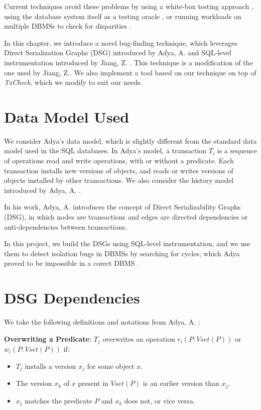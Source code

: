 Current techniques avoid these problems by using a white-box testing approach \cite{clark2024validating}, using the database system itself as a testing oracle \cite{jiang2023detecting}, or running workloads on multiple DBMSs to check for disparities \cite{cui2022differentially_ASE2022}.

In this chapter, we introduce a novel bug-finding technique, which leverages Direct Serialization Graphs (DSG) introduced by Adya, A. \cite{adya1999weak} and SQL-level instrumentation introduced by Jiang, Z. \cite{jiang2023detecting}. This technique is a modification of the one used by Jiang, Z.. We also implement a tool based on our technique on top of \textit{TxCheck}, which we modify to suit our needs.


\section{Data Model Used}

We consider Adya's data model, which is slightly different from the standard data model used in the SQL databases. In Adya's model, a transaction $T_i$ is a sequence of operations read and write operations, with or without a predicate. Each transaction installs new versions of objects, and reads or writes versions of objects installed by other transactions. We also consider the history model introduced by Adya, A. \cite{adya1999weak}.

In his work, Adya, A. \cite{adya1999weak} introduces the concept of Direct Serializability Graphs (DSG), in which nodes are transactions and edges are directed dependencies or anti-dependencies between transactions.

In this project, we build the DSGs using SQL-level instrumentation, and we use them to detect isolation bugs in DBMSs by searching for cycles, which Adya proved to be impossible in a corect DBMS \cite{adya1999weak}.

\section{DSG Dependencies}

We take the following definitions and notations from Adya, A. \cite{adya1999weak}:


\begin{definition}
    \textbf{Overwriting a Predicate}: $T_j$ overwrites an operation $r_i(P: Vset(P))$ or $w_i(P: Vset(P))$ if:
    \begin{itemize}
        \item $T_j$ installs a version $x_j$ for some object $x$.
        \item The version $x_k$ of $x$ present in $Vset(P)$ is an earlier version than $x_j$.
        \item $x_j$ matches the predicate $P$ and $x_k$ does not, or vice versa.
    \end{itemize}  
\end{definition}

